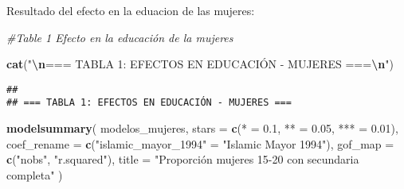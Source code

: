 \documentclass[
]{article}
\newenvironment{Shaded}{\begin{snugshade}}{\end{snugshade}}
\newcommand{\AttributeTok}[1]{\textcolor[rgb]{0.13,0.29,0.53}{#1}}
\newcommand{\CommentTok}[1]{\textcolor[rgb]{0.56,0.35,0.01}{\textit{#1}}}
\newcommand{\FloatTok}[1]{\textcolor[rgb]{0.00,0.00,0.81}{#1}}
\newcommand{\FunctionTok}[1]{\textcolor[rgb]{0.13,0.29,0.53}{\textbf{#1}}}
\newcommand{\NormalTok}[1]{#1}
\newcommand{\OtherTok}[1]{\textcolor[rgb]{0.56,0.35,0.01}{#1}}
\newcommand{\SpecialCharTok}[1]{\textcolor[rgb]{0.81,0.36,0.00}{\textbf{#1}}}
\newcommand{\StringTok}[1]{\textcolor[rgb]{0.31,0.60,0.02}{#1}}
\begin{document}
Resultado del efecto en la eduacion de las mujeres:

\begin{Shaded}
\begin{Highlighting}[]
\CommentTok{\#Table 1 Efecto en la educación de la mujeres}

\FunctionTok{cat}\NormalTok{(}\StringTok{"}\SpecialCharTok{\textbackslash{}n}\StringTok{=== TABLA 1: EFECTOS EN EDUCACIÓN {-} MUJERES ===}\SpecialCharTok{\textbackslash{}n}\StringTok{"}\NormalTok{)}
\end{Highlighting}
\end{Shaded}

\begin{verbatim}
## 
## === TABLA 1: EFECTOS EN EDUCACIÓN - MUJERES ===
\end{verbatim}

\begin{Shaded}
\begin{Highlighting}[]
\FunctionTok{modelsummary}\NormalTok{(}
\NormalTok{  modelos\_mujeres,}
  \AttributeTok{stars =} \FunctionTok{c}\NormalTok{(}\StringTok{\textquotesingle{}*\textquotesingle{}} \OtherTok{=} \FloatTok{0.1}\NormalTok{, }\StringTok{\textquotesingle{}**\textquotesingle{}} \OtherTok{=} \FloatTok{0.05}\NormalTok{, }\StringTok{\textquotesingle{}***\textquotesingle{}} \OtherTok{=} \FloatTok{0.01}\NormalTok{),}
  \AttributeTok{coef\_rename =} \FunctionTok{c}\NormalTok{(}\StringTok{"islamic\_mayor\_1994"} \OtherTok{=} \StringTok{"Islamic Mayor 1994"}\NormalTok{),}
  \AttributeTok{gof\_map =} \FunctionTok{c}\NormalTok{(}\StringTok{"nobs"}\NormalTok{, }\StringTok{"r.squared"}\NormalTok{),}
  \AttributeTok{title =} \StringTok{"Proporción mujeres 15{-}20 con secundaria completa"}
\NormalTok{)}
\end{Highlighting}
\end{Shaded}
\end{document}
